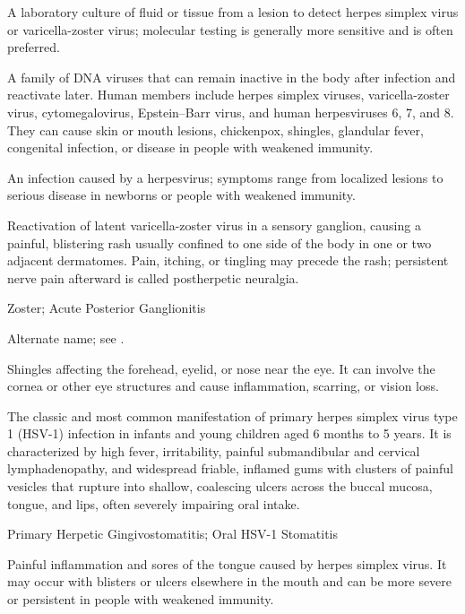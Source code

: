  A laboratory culture of fluid or tissue from a lesion to detect herpes simplex virus or varicella-zoster virus; molecular testing is generally more sensitive and is often preferred.

 A family of DNA viruses that can remain inactive in the body after infection and reactivate later. Human members include herpes simplex viruses, varicella-zoster virus, cytomegalovirus, Epstein--Barr virus, and human herpesviruses 6, 7, and 8. They can cause skin or mouth lesions, chickenpox, shingles, glandular fever, congenital infection, or disease in people with weakened immunity.

 An infection caused by a herpesvirus; symptoms range from localized lesions to serious disease in newborns or people with weakened immunity.

 Reactivation of latent varicella-zoster virus in a sensory ganglion, causing a painful, blistering rash usually confined to one side of the body in one or two adjacent dermatomes. Pain, itching, or tingling may precede the rash; persistent nerve pain afterward is called postherpetic neuralgia.

\synonyms
Zoster; Acute Posterior Ganglionitis

 Alternate name; see .

 Shingles affecting the forehead, eyelid, or nose near the eye. It can involve the cornea or other eye structures and cause inflammation, scarring, or vision loss.

 The classic and most common manifestation of primary herpes simplex virus type 1 (HSV-1) infection in infants and young children aged 6 months to 5 years. It is characterized by high fever, irritability, painful submandibular and cervical lymphadenopathy, and widespread friable, inflamed gums with clusters of painful vesicles that rupture into shallow, coalescing ulcers across the buccal mucosa, tongue, and lips, often severely impairing oral intake.

\synonyms
Primary Herpetic Gingivostomatitis; Oral HSV-1 Stomatitis

 Painful inflammation and sores of the tongue caused by herpes simplex virus. It may occur with blisters or ulcers elsewhere in the mouth and can be more severe or persistent in people with weakened immunity.

